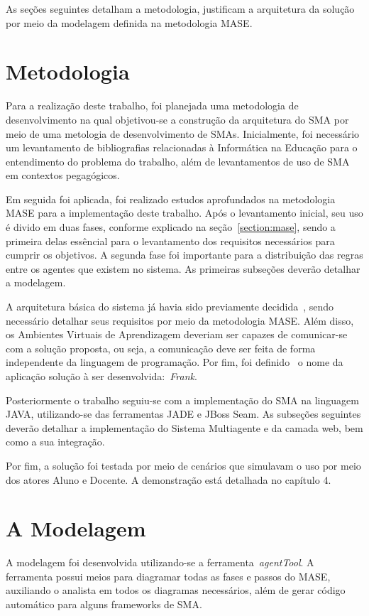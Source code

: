 As seções seguintes detalham a metodologia, justificam a arquitetura da solução por meio da modelagem definida na metodologia MASE.

\section{Metodologia}
Para a realização deste trabalho, foi planejada uma metodologia de desenvolvimento na qual objetivou-se a construção da arquitetura do SMA por meio de uma metologia de desenvolvimento de SMAs. Inicialmente, foi necessário um levantamento de bibliografias relacionadas à Informática na Educação para o entendimento do problema do trabalho, além de levantamentos de uso de SMA em contextos pegagógicos.

Em seguida foi aplicada, foi realizado estudos aprofundados na metodologia MASE para a implementação deste trabalho. Após o levantamento inicial, seu uso é divido em duas fases, conforme explicado na seção~\ref{section:mase}, sendo a primeira delas essêncial para o levantamento dos requisitos necessários para cumprir os objetivos. A segunda fase foi importante para a distribuição das regras entre os agentes que existem no sistema. As primeiras subseções deverão detalhar a modelagem.

A arquitetura básica do sistema já havia sido previamente decidida~\cite{editalFrank}, sendo necessário detalhar seus requisitos por meio da metodologia MASE. Além disso, os Ambientes Virtuais de Aprendizagem deveriam ser capazes de comunicar-se com a solução proposta, ou seja, a comunicação deve ser feita de forma independente da linguagem de programação. Por fim, foi definido~\cite{editalFrank} o nome da aplicação solução à ser desenvolvida:~\emph{Frank}.

Posteriormente o trabalho seguiu-se com a implementação do SMA na linguagem JAVA, utilizando-se das ferramentas JADE e JBoss Seam. As subseções seguintes deverão detalhar a implementação do Sistema Multiagente e da camada web, bem como a sua integração.

Por fim, a solução foi testada por meio de cenários que simulavam o uso por meio dos atores Aluno e Docente. A demonstração está detalhada no capítulo 4.

\section{A Modelagem}

A modelagem foi desenvolvida utilizando-se a ferramenta~\emph{agentTool}. A ferramenta possui meios para diagramar todas as fases e passos do MASE, auxiliando o analista em todos os diagramas necessários, além de gerar código automático para alguns frameworks de SMA.

